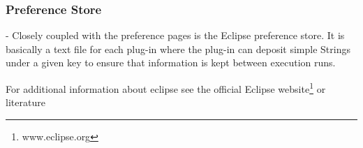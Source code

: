 \subsubsection{Preference Store}
- Closely coupled with the preference pages is the Eclipse preference store. It is
basically a text file for each plug-in where the plug-in can deposit simple Strings
under a given key to ensure that information is kept between execution runs.

For additional information about eclipse see the official Eclipse website\footnote{www.eclipse.org} or literature \cite{eclipsePlugins}